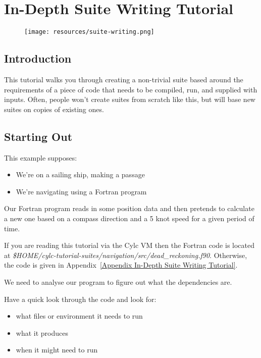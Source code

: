 \section{In-Depth Suite Writing Tutorial}
\label{In-Depth Suite Writing Tutorial}

\begin{figure}[htp]
\texttt{[image: resources/suite-writing.png]}
\end{figure}

\subsection{Introduction}

This tutorial walks you through creating a non-trivial suite based around the requirements of a piece of code that needs to be compiled, run, and supplied with inputs. Often, people won't create suites from scratch like this, but will base new suites on copies of existing ones.

\subsection{Starting Out}

This example supposes:
\begin{itemize}
    \item We're on a sailing ship, making a passage
    \item We're navigating using a Fortran program
\end{itemize}

Our Fortran program reads in some position data and then pretends to calculate a new one based on a compass direction and a 5 knot speed for a given period of time.

If you are reading this tutorial via the Cylc VM then the Fortran code is located at {\em \$HOME/cylc-tutorial-suites/navigation/src/dead\_reckoning.f90}. Otherwise, the code is given in Appendix~\ref{Appendix In-Depth Suite Writing Tutorial}.

We need to analyse our program to figure out what the dependencies are.

Have a quick look through the code and look for:
\begin{itemize}
    \item what files or environment it needs to run
    \item what it produces
    \item when it might need to run
\end{itemize}

